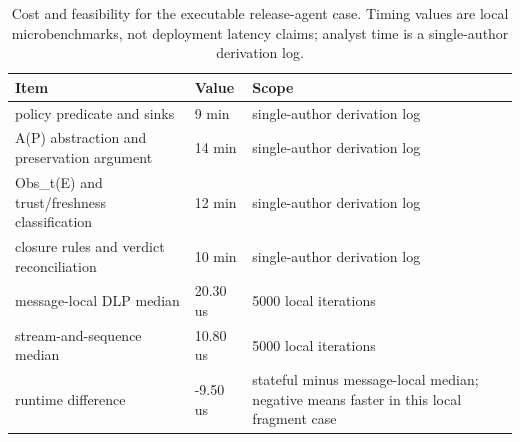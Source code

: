 \begin{table}[t]
  \caption{Cost and feasibility for the executable release-agent case. Timing
  values are local microbenchmarks, not deployment latency claims; analyst time
  is a single-author derivation log.}
  \label{tab:case-costs}
  \centering\footnotesize
  \begin{tabular}{@{}p{}p{}p{}@{}}
    \toprule
    Item & Value & Scope \\
    \midrule
    policy predicate and sinks & 9 min & single-author derivation log \\
    A(P) abstraction and preservation argument & 14 min & single-author derivation log \\
    Obs\_t(E) and trust/freshness classification & 12 min & single-author derivation log \\
    closure rules and verdict reconciliation & 10 min & single-author derivation log \\
    message-local DLP median & 20.30 us & 5000 local iterations \\
    stream-and-sequence median & 10.80 us & 5000 local iterations \\
    runtime difference & -9.50 us & stateful minus message-local median; negative means faster in this local fragment case \\
    \bottomrule
  \end{tabular}
\end{table}
